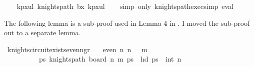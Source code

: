 \begin{isabellebody}
\ \ {\isacharbrackleft}{\kern0pt}{}{\isacharcomma}{\kern0pt}{}{}{\isacharcomma}{\kern0pt}{}{}{\isacharcomma}{\kern0pt}{}{}{\isacharcomma}{\kern0pt}{}{\isacharcomma}{\kern0pt}{}{}{\isacharcomma}{\kern0pt}{}{}{\isacharcomma}{\kern0pt}{}{}{\isacharcomma}{\kern0pt}{}{\isacharbrackright}{\kern0pt}{\isacharbrackright}{\kern0pt}{\isacharparenright}{\kern0pt}{\isachardoublequoteclose}\isanewline
{}\isamarkupfalse%
\ kp{\isacharunderscore}{\kern0pt}{}x{}{\isacharunderscore}{\kern0pt}ul{\isacharcolon}{\kern0pt}\ {\isachardoublequoteopen}knights{\isacharunderscore}{\kern0pt}path\ b{}x{}\ kp{}x{}ul{\isachardoublequoteclose}\isanewline
%
\isadelimproof
\ \ %
\endisadelimproof
%
\isatagproof
{}\isamarkupfalse%
\ {\isacharparenleft}{\kern0pt}simp\ only{\isacharcolon}{\kern0pt}\ knights{\isacharunderscore}{\kern0pt}path{\isacharunderscore}{\kern0pt}exec{\isacharunderscore}{\kern0pt}simp{\isacharparenright}{\kern0pt}\ eval%
\endisatagproof
{\isafoldproof}%
%
\isadelimproof
%
\endisadelimproof
%
\begin{isamarkuptext}%
The following lemma is a sub-proof used in Lemma 4 in \cite{cull_decurtins_1987}. 
I moved the sub-proof out to a separate lemma.%
\end{isamarkuptext}\isamarkuptrue%
\isamarkupfalse%
\ knights{\isacharunderscore}{\kern0pt}circuit{\isacharunderscore}{\kern0pt}exists{\isacharunderscore}{\kern0pt}even{\isacharunderscore}{\kern0pt}n{\isacharunderscore}{\kern0pt}gr{}{}{\isacharcolon}{\kern0pt}\isanewline
\ \ \ {\isachardoublequoteopen}even\ n{\isachardoublequoteclose}\ {\isachardoublequoteopen}n\ {\isasymge}\ {}{}{\isachardoublequoteclose}\ {\isachardoublequoteopen}m\ {\isasymge}\ {}{\isachardoublequoteclose}\isanewline
\ \ \ \ \ \ \ \ \ \ {\isachardoublequoteopen}{\isasymexists}ps{\isachardot}{\kern0pt}\ knights{\isacharunderscore}{\kern0pt}path\ {\isacharparenleft}{\kern0pt}board\ {\isacharparenleft}{\kern0pt}n{\isacharminus}{\kern0pt}{}{\isacharparenright}{\kern0pt}\ m{\isacharparenright}{\kern0pt}\ ps\ {\isasymand}\ hd\ ps\ {\isacharequal}{\kern0pt}\ {\isacharparenleft}{\kern0pt}int\ {\isacharparenleft}{\kern0pt}n{\isacharminus}{\kern0pt}{}{\isacharparenright}{\kern0pt}{\isacharcomma}{\kern0pt}{}{\isacharparenright}{\kern0pt}\ \isanewline

\end{isabellebody}
